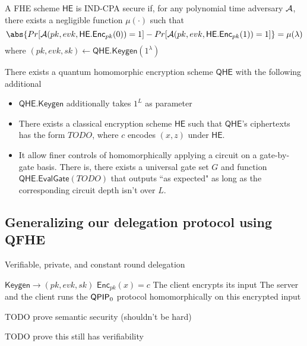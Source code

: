\begin{dfn}
	A FHE scheme $\mathsf{HE}$ is IND-CPA secure if, for any polynomial time adversary $\mathcal{A}$, there exists a negligible function $\mu(\cdot)$ such that
	$$\abs{Pr[\cA(pk, evk, \mathsf{HE.Enc}_{pk}(0))=1]-Pr[\cA(pk, evk, \mathsf{HE.Enc}_{pk}(1))=1]}=\mu(\lambda)$$
	where $(pk, evk, sk)\leftarrow\mathsf{QHE.Keygen}(1^\lambda)$
\end{dfn}

\begin{thm}
	There exists a quantum homomorphic encryption scheme $\mathsf{QHE}$ with the following additional
	\begin{itemize}
		\item $\mathsf{QHE.Keygen}$ additionally takes $1^L$ as parameter
		\item There exists a classical encryption scheme $\mathsf{HE}$ such that $\mathsf{QHE}$'s ciphertexts has the form $TODO$, where $c$ encodes $(x, z)$ under $\mathsf{HE}$.
		\item It allow finer controls of homomorphically applying a circuit on a gate-by-gate basis. There is, there exists a universal gate set $G$ and function $\mathsf{QHE.EvalGate}(TODO)$ that outputs ``as expected"  as long as the corresponding  circuit depth isn't over $L$.
	\end{itemize}
\end{thm}

\subsection{Generalizing our delegation protocol using QFHE}

\begin{algorithm}
	\caption{Verifiable, private, and constant round delegation}
	\label{ProtoPrivateDelegation}
	\begin{algorithmic}[1]
		\State $\mathsf{Keygen}\rightarrow(pk, evk, sk)$
		\State $\mathsf{Enc}_{pk}(x)=c$
		\State The client encrypts its input
		\State The server and the client runs the $\operatorname{\mathsf{QPIP}}_0$ protocol homomorphically on this encrypted input 
	\end{algorithmic}
\end{algorithm}

TODO prove semantic security (shouldn't be hard)

TODO prove this still has verifiability
